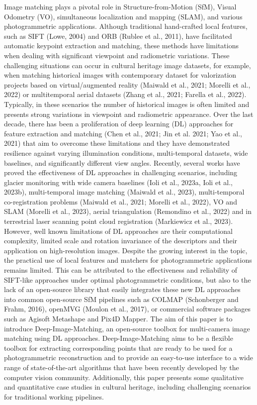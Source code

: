 Image matching plays a pivotal role in Structure-from-Motion (SfM), Visual Odometry (VO), simultaneous localization and mapping (SLAM), and various photogrammetric applications. Although traditional hand-crafted local features, such as SIFT (Lowe, 2004) and ORB (Rublee et al., 2011), have facilitated automatic keypoint extraction and matching, these methods have limitations when dealing with significant viewpoint and radiometric variations. These challenging situations can occur in cultural heritage image datasets, for example, when matching historical images with contemporary dataset for valorization projects based on virtual/augmented reality (Maiwald et al., 2021; Morelli et al., 2022) or multitemporal aerial datasets (Zhang et al., 2021; Farella et al., 2022). Typically, in these scenarios the number of historical images is often limited and presents strong variations in viewpoint and radiometric appearance.
Over the last decade, there has been a proliferation of deep learning (DL) approaches for feature extraction and matching (Chen et al., 2021; Jin et al. 2021; Yao et al., 2021) that aim to overcome these limitations and they have demonstrated resilience against varying illumination conditions, multi-temporal datasets, wide baselines, and significantly different view angles. Recently, several works have proved the effectiveness of DL approaches in challenging scenarios, including glacier monitoring with wide camera baselines (Ioli et al., 2023a, Ioli et al., 2023b), multi-temporal image matching (Maiwald et al., 2023), multi-temporal co-registration problems (Maiwald et al., 2021; Morelli et al., 2022), VO and SLAM (Morelli et al., 2023), aerial triangulation (Remondino et al., 2022) and in terrestrial laser scanning point cloud registration (Markiewicz et al., 2023). However, well known limitations of DL approaches are their computational complexity, limited scale and rotation invariance of the descriptors and their application on high-resolution images.
Despite the growing interest in the topic, the practical use of local features and matchers for photogrammetric applications remains limited. This can be attributed to the effectiveness and reliability of SIFT-like approaches under optimal photogrammetric conditions, but also to the lack of an open-source library that easily integrates these new DL approaches into common open-source SfM pipelines such as COLMAP (Schonberger and Frahm, 2016), openMVG (Moulon et al., 2017), or commercial software packages such as Agisoft Metashape and Pix4D Mapper.
The aim of this paper is to introduce Deep-Image-Matching, an open-source toolbox for multi-camera image matching using DL approaches. Deep-Image-Matching aims to be a flexible toolbox for extracting corresponding points that are ready to be used for a photogrammetric reconstruction and to provide an easy-to-use interface to a wide range of state-of-the-art algorithms that have been recently developed by the computer vision community. Additionally, this paper presents some qualitative and quantitative case studies in cultural heritage, including challenging scenarios for traditional working pipelines. 
